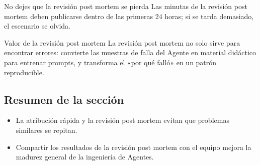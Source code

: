 \begin{warningbox}{No dejes que la revisión post mortem se pierda}
Las minutas de la revisión post mortem deben publicarse dentro de las primeras 24 horas; si se tarda demasiado, el escenario se olvida.
\end{warningbox}

\begin{knowledgebox}{Valor de la revisión post mortem}
La revisión post mortem no solo sirve para encontrar errores: convierte las muestras de falla del Agente en material didáctico para entrenar prompts, y transforma el «por qué falló» en un patrón reproducible.
\end{knowledgebox}

\subsection{Resumen de la sección}
\begin{itemize}
    \item La atribución rápida y la revisión post mortem evitan que problemas similares se repitan.
    \item Compartir los resultados de la revisión post mortem con el equipo mejora la madurez general de la ingeniería de Agentes.
\end{itemize}

